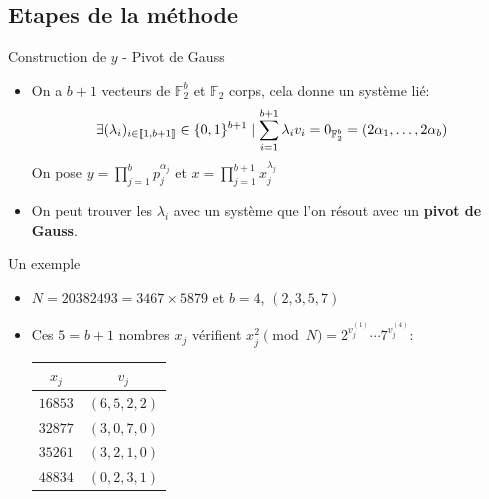\documentclass{beamer}
\begin{document}
\subsection{Etapes de la méthode}



\begin{frame}{Construction de $y$ - Pivot de Gauss}
    \begin{itemize}[<+->]
        \item On a $b+1$ vecteurs de $\mathbb F_2^b$ et $\mathbb F_2$ corps, cela donne un système lié:
        $$
        \exists (\lambda_i)_{i \in \llbracket 1,b+1 \rrbracket}\in \mathbb \{0,1\}^{b+1} \mid \sum_{i=1}^{b+1} \lambda_iv_i = 0_{\mathbb F_2^b} = (2\alpha_1, \dots, 2\alpha_b)
        $$
        On pose $y = \prod_{j=1}^b p_j^{\alpha_j}$ et $x = \prod_{j=1}^{b+1}x_j^{\lambda_j}$ 
        \item On peut trouver les $\lambda_i$ avec un système que l'on résout avec un \textbf{pivot de Gauss}.
    \end{itemize}
\end{frame}


\begin{frame}{Un exemple}
    \begin{itemize}
        \item $N = 20382493 = 3467 \times 5879$ et $b = 4$, $(2, 3, 5, 7)$
        \item Ces $5=b+1$ nombres $x_j$ vérifient $ x_j^2 \pmod N = 2^{v_j^{(1)}}\cdots 7^{v_j^{(4)}}$:
            \begin{center}
                \begin{tabular}{|c|c|}
                    \hline
                    $x_j$ & $v_j$ \\
                    \hline \hline
                    $16853$ & $(6,5,2,2)$\\
                    \hline
                    $32877$ & $(3,0,7,0)$\\
                    \hline
                    $35261$ & $(3,2,1,0)$\\
                    \hline
                    $48834$ & $(0,2,3,1)$\\
                    \hline
                \end{tabular}
            \end{center}
    \end{itemize}
\end{frame}
\end{document}
